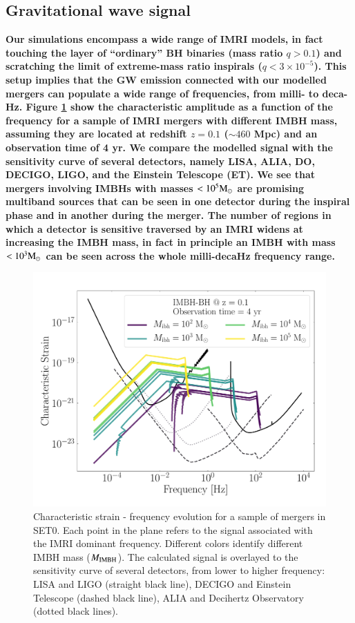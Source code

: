 \documentclass[article]{aa}
\newcommand{\Ms}{{\rm M}_\odot}
\newcommand{\ibh}{{\rm IMBH}}
\begin{document}
\subsection{Gravitational wave signal}
{\bf
Our simulations encompass a wide range of IMRI models, in fact touching the layer of ``ordinary'' BH binaries (mass ratio $q>0.1$) and 
scratching the limit of extreme-mass ratio inspirals ($q < 3 \times10^{-5}$). This setup implies that the GW emission connected with our modelled mergers can populate a wide range of frequencies, from milli- to deca-Hz. Figure \ref{fig:f13} show the characteristic amplitude as a function of the frequency for a sample of IMRI mergers with different IMBH mass, assuming they are located at redshift $z=0.1$ ($\sim 460$ Mpc) and an observation time of 4 yr. We compare the modelled signal with the sensitivity curve of several detectors, namely LISA, ALIA, DO, DECIGO, LIGO, and the Einstein Telescope (ET). We see that mergers involving IMBHs with masses $< 10^5\Ms$ are promising multiband sources that can be seen in one detector during the inspiral phase and in another during the merger. The number of regions in which a detector is sensitive traversed by an IMRI widens at increasing the IMBH mass, in fact in principle an IMBH with mass $<10^3\Ms$ can be seen across the whole milli-decaHz frequency range.  

\begin{figure}
\centering
\includegraphics[width=\columnwidth]{test}
\caption{Characteristic strain - frequency evolution for a sample of mergers in SET0. Each point in the plane refers to the signal associated with the IMRI dominant frequency. Different colors identify different IMBH mass ($M_\ibh$). The calculated signal is overlayed to the sensitivity curve of several detectors, from lower to higher frequency: LISA and LIGO (straight black line), DECIGO and Einstein Telescope (dashed black line), ALIA and Decihertz Observatory (dotted black lines).}
\label{fig:f13}
\end{figure}

}
\end{document}
